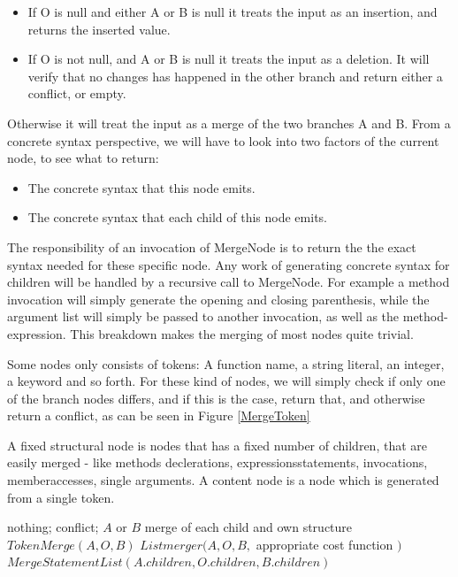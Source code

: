 \documentclass[11pt]{article}
\begin{document}
\begin{itemize}
   \item If O is null and either A or B is null it treats the input as an insertion, and returns the inserted value.
   \item If O is not null, and A or B is null it treats the input as a deletion. It will verify that no changes has happened in the other branch and return either a conflict, or empty.
\end{itemize}

Otherwise it will treat the input as a merge of the two branches A and B. From a concrete syntax perspective, we will have to look into two factors of the current node, to see what to return:

\begin{itemize}
   \item The concrete syntax that this node emits.
   \item The concrete syntax that each child of this node emits.
\end{itemize}

The responsibility of an invocation of MergeNode is to return the the exact syntax needed for these specific node. Any work of generating concrete syntax for children will be handled by a recursive call to MergeNode. For example a method invocation will simply generate the opening and closing parenthesis, while the argument list will simply be passed to another invocation, as well as the method-expression. This breakdown makes the merging of most nodes quite trivial.

Some nodes only consists of tokens: A function name, a string literal, an integer, a keyword and so forth. For these kind of nodes, we will simply check if only one of the branch nodes differs, and if this is the case, return that, and otherwise return a conflict, as can be seen in Figure \ref{MergeToken}


\begin{algorithm}
\caption{A fixed structural node is nodes that has a fixed number of children, that are easily merged - like methods declerations, expressionsstatements, invocations, memberaccesses, single arguments. A content node is a node which is generated from a single token.}
\label{MergeNode}
\begin{algorithmic}
            \State \Return nothing;
        \Else
            \State \Return conflict;
        \EndIf
    \EndIf
        \State \Return $A$ or $B$
    \EndIf
        \State \Return merge of each child and own structure
    \EndIf
        \State \Return $TokenMerge(A, O, B)$
    \EndIf
        \State \Return $Listmerger(A, O, B, $ appropriate cost function $)$
    \EndIf
        \State \Return $MergeStatementList(A.children, O.children, B.children)$
    \EndIf
\EndFunction
\end{algorithmic}
\end{algorithm}
\end{document}
